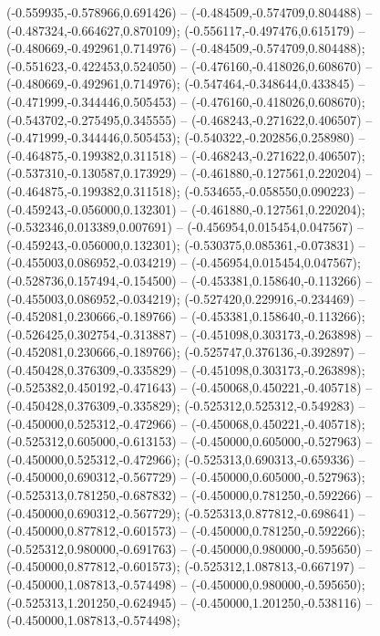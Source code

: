  (-0.559935,-0.578966,0.691426) -- (-0.484509,-0.574709,0.804488) -- (-0.487324,-0.664627,0.870109);
 (-0.556117,-0.497476,0.615179) -- (-0.480669,-0.492961,0.714976) -- (-0.484509,-0.574709,0.804488);
 (-0.551623,-0.422453,0.524050) -- (-0.476160,-0.418026,0.608670) -- (-0.480669,-0.492961,0.714976);
 (-0.547464,-0.348644,0.433845) -- (-0.471999,-0.344446,0.505453) -- (-0.476160,-0.418026,0.608670);
 (-0.543702,-0.275495,0.345555) -- (-0.468243,-0.271622,0.406507) -- (-0.471999,-0.344446,0.505453);
 (-0.540322,-0.202856,0.258980) -- (-0.464875,-0.199382,0.311518) -- (-0.468243,-0.271622,0.406507);
 (-0.537310,-0.130587,0.173929) -- (-0.461880,-0.127561,0.220204) -- (-0.464875,-0.199382,0.311518);
 (-0.534655,-0.058550,0.090223) -- (-0.459243,-0.056000,0.132301) -- (-0.461880,-0.127561,0.220204);
 (-0.532346,0.013389,0.007691) -- (-0.456954,0.015454,0.047567) -- (-0.459243,-0.056000,0.132301);
 (-0.530375,0.085361,-0.073831) -- (-0.455003,0.086952,-0.034219) -- (-0.456954,0.015454,0.047567);
 (-0.528736,0.157494,-0.154500) -- (-0.453381,0.158640,-0.113266) -- (-0.455003,0.086952,-0.034219);
 (-0.527420,0.229916,-0.234469) -- (-0.452081,0.230666,-0.189766) -- (-0.453381,0.158640,-0.113266);
 (-0.526425,0.302754,-0.313887) -- (-0.451098,0.303173,-0.263898) -- (-0.452081,0.230666,-0.189766);
 (-0.525747,0.376136,-0.392897) -- (-0.450428,0.376309,-0.335829) -- (-0.451098,0.303173,-0.263898);
 (-0.525382,0.450192,-0.471643) -- (-0.450068,0.450221,-0.405718) -- (-0.450428,0.376309,-0.335829);
 (-0.525312,0.525312,-0.549283) -- (-0.450000,0.525312,-0.472966) -- (-0.450068,0.450221,-0.405718);
 (-0.525312,0.605000,-0.613153) -- (-0.450000,0.605000,-0.527963) -- (-0.450000,0.525312,-0.472966);
 (-0.525313,0.690313,-0.659336) -- (-0.450000,0.690312,-0.567729) -- (-0.450000,0.605000,-0.527963);
 (-0.525313,0.781250,-0.687832) -- (-0.450000,0.781250,-0.592266) -- (-0.450000,0.690312,-0.567729);
 (-0.525313,0.877812,-0.698641) -- (-0.450000,0.877812,-0.601573) -- (-0.450000,0.781250,-0.592266);
 (-0.525312,0.980000,-0.691763) -- (-0.450000,0.980000,-0.595650) -- (-0.450000,0.877812,-0.601573);
 (-0.525312,1.087813,-0.667197) -- (-0.450000,1.087813,-0.574498) -- (-0.450000,0.980000,-0.595650);
 (-0.525313,1.201250,-0.624945) -- (-0.450000,1.201250,-0.538116) -- (-0.450000,1.087813,-0.574498);
